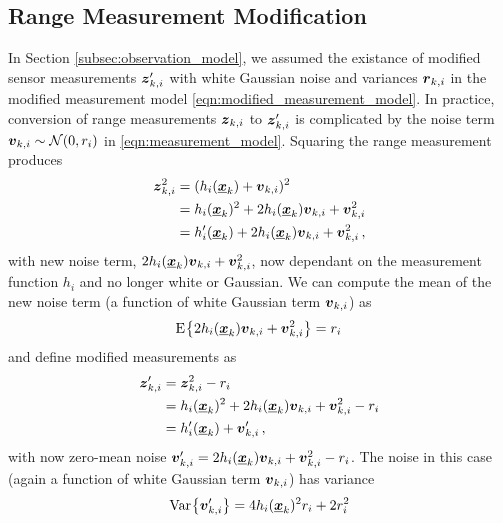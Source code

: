 \documentclass[twocolumn]{autart}
\begin{document}
\subsection{Range Measurement Modification} \label{subsec:range_measurement_mod}
In Section \ref{subsec:observation_model}, we assumed the existance of modified sensor measurements ${\boldsymbol{z}}'_{k,i}$ with white Gaussian noise and variances ${\boldsymbol{r}}_{k,i}$ in the modified measurement model \eqref{eqn:modified_measurement_model}. In practice, conversion of range measurements ${\boldsymbol{z}}_{k,i}$ to ${\boldsymbol{z}}'_{k,i}$ is complicated by the noise term ${\boldsymbol{v}}_{k,i} \sim \mathcal{N}(0, r_i)$ in \eqref{eqn:measurement_model}. Squaring the range measurement produces
\begin{equation}
    \begin{split}
        {\boldsymbol{z}}_{k,i}^2 &= (h_i({\boldsymbol{\underline{x}}}_k) + {\boldsymbol{v}}_{k,i})^2 \\
        &= h_i({\boldsymbol{\underline{x}}}_k)^2 + 2h_i({\boldsymbol{\underline{x}}}_k){\boldsymbol{v}}_{k,i} + {\boldsymbol{v}}_{k,i}^2 \\
        &= h'_i({\boldsymbol{\underline{x}}}_k) + 2h_i({\boldsymbol{\underline{x}}}_k){\boldsymbol{v}}_{k,i} + {\boldsymbol{v}}_{k,i}^2\,,
    \end{split}
\end{equation}
with new noise term, $2h_i({\boldsymbol{\underline{x}}}_k){\boldsymbol{v}}_{k,i} + {\boldsymbol{v}}_{k,i}^2$, now dependant on the measurement function $h_i$ and no longer white or Gaussian. We can compute the mean of the new noise term (a function of white Gaussian term ${\boldsymbol{v}}_{k,i}$) as
\begin{equation}
    \E{2h_i(\rvec{x}_k)\rv{v}_{k,i} + \rv{v}_{k,i}^2} = r_i\, \label{eqn:modified_noise_mean}
\end{equation}
and define modified measurements as
\begin{equation} \label{eqn:modified_measurement}
    \begin{split}
        {\boldsymbol{z}}'_{k,i} &= {\boldsymbol{z}}_{k,i}^2 - r_i \\
        &= h_i({\boldsymbol{\underline{x}}}_k)^2 + 2h_i({\boldsymbol{\underline{x}}}_k){\boldsymbol{v}}_{k,i} + {\boldsymbol{v}}_{k,i}^2 - r_i \\
        &= h'_i({\boldsymbol{\underline{x}}}_k) + {\boldsymbol{v}}'_{k,i}\,,
    \end{split}
\end{equation}
with now zero-mean noise ${\boldsymbol{v}}'_{k,i} = 2h_i({\boldsymbol{\underline{x}}}_k){\boldsymbol{v}}_{k,i} + {\boldsymbol{v}}_{k,i}^2 - r_i$. The noise in this case (again a function of white Gaussian term ${\boldsymbol{v}}_{k,i}$) has variance 
\begin{equation}
    \Var{\rv{v}'_{k,i}} = 4h_i(\rvec{x}_k)^2r_i + 2r_i^2
\end{equation}
\end{document}

